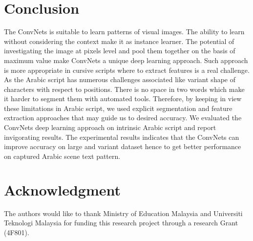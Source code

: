 \documentclass[conference]{IEEEtran}
\begin{document}
\section{Conclusion}

The ConvNets is suitable to learn patterns of visual images.
The ability to learn without considering the context make it as instance learner.
The potential of investigating the image at pixels level and pool them together on the basis of maximum value make ConvNets a unique deep learning approach.
Such approach is more appropriate in cursive scripts where to extract features is a real challenge.
As the Arabic script has numerous challenges associated like variant shape of characters with respect to positions.
There is no space in two words which make it harder to segment them with automated tools.
Therefore, by keeping in view these limitations in Arabic script, we used explicit segmentation and feature extraction approaches that may guide us to desired accuracy.
We evaluated the ConvNets deep learning approach on intrinsic Arabic script and report invigorating results.
The experimental results indicates that the ConvNets can improve accuracy on large and variant dataset hence to get better performance on captured Arabic scene text pattern.

\section*{Acknowledgment}
The authors would like to thank Ministry of Education Malaysia and Universiti Teknologi Malaysia for funding this research project through a research Grant (4F801).


%
\end{document}
